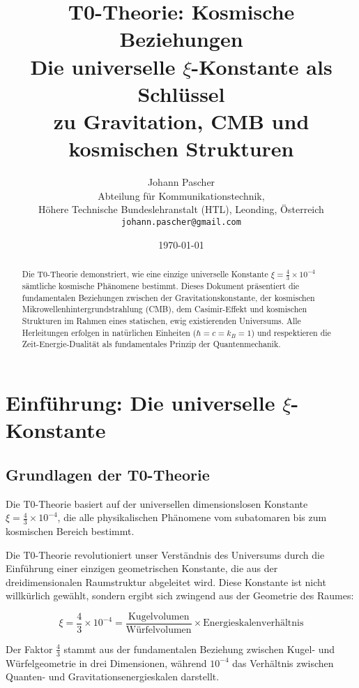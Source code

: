 \documentclass[12pt,a4paper]{article}
\title{\Huge\textbf{T0-Theorie: Kosmische Beziehungen}\\
	\Large Die universelle $\xi$-Konstante als Schlüssel \\
	zu Gravitation, CMB und kosmischen Strukturen}
\author{Johann Pascher\\
	Abteilung für Kommunikationstechnik, \\Höhere Technische Bundeslehranstalt (HTL), Leonding, Österreich\\
	\texttt{johann.pascher@gmail.com}}
\date{\today}
\begin{document}
	
	\maketitle
	
	\begin{abstract}
		Die T0-Theorie demonstriert, wie eine einzige universelle Konstante $\xi = \frac{4}{3} \times 10^{-4}$ s\"amtliche kosmische Ph\"anomene bestimmt. Dieses Dokument pr\"asentiert die fundamentalen Beziehungen zwischen der Gravitationskonstante, der kosmischen Mikrowellenhintergrundstrahlung (CMB), dem Casimir-Effekt und kosmischen Strukturen im Rahmen eines statischen, ewig existierenden Universums. Alle Herleitungen erfolgen in nat\"urlichen Einheiten ($\hbar = c = k_B = 1$) und respektieren die Zeit-Energie-Dualit\"at als fundamentales Prinzip der Quantenmechanik.
	\end{abstract}
	
	\tableofcontents
	\newpage
	
	\section{Einf\"uhrung: Die universelle $\xi$-Konstante}
	
	\subsection{Grundlagen der T0-Theorie}
	
	\begin{important}
		Die T0-Theorie basiert auf der universellen dimensionslosen Konstante $\xi = \frac{4}{3} \times 10^{-4}$, die alle physikalischen Ph\"anomene vom subatomaren bis zum kosmischen Bereich bestimmt.
	\end{important}
	
	Die T0-Theorie revolutioniert unser Verst\"andnis des Universums durch die Einf\"uhrung einer einzigen geometrischen Konstante, die aus der dreidimensionalen Raumstruktur abgeleitet wird. Diese Konstante ist nicht willk\"urlich gew\"ahlt, sondern ergibt sich zwingend aus der Geometrie des Raumes:
	
	\begin{equation}
		\xi = \frac{4}{3} \times 10^{-4} = \frac{\text{Kugelvolumen}}{\text{Würfelvolumen}} \times \text{Energieskalenverh\"altnis}
	\end{equation}
	
	Der Faktor $\frac{4}{3}$ stammt aus der fundamentalen Beziehung zwischen Kugel- und Würfelgeometrie in drei Dimensionen, während $10^{-4}$ das Verhältnis zwischen Quanten- und Gravitationsenergieskalen darstellt.
	
\end{document}
